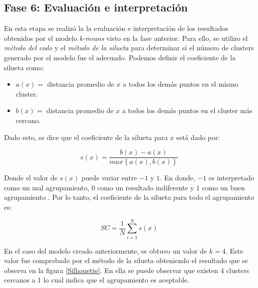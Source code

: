 \subsection*{Fase 6: Evaluación e interpretación}

En esta etapa se realizó la la evaluación e interpretación de los resultados obtenidos por el modelo \textit{k-means} visto en la fase anterior. Para ello, se utilizo el \textit{método del codo} y el \textit{método de la silueta} para determinar si el número de clusters generado por el modelo fue el adecuado. Podemos definir el coeficiente de la silueta como:

\begin{itemize}[label=]
	\item $a(x)=$ distancia promedio de $x$ a todos los demás puntos en el mismo cluster.\\
	\item $b(x)=$ distancia promedio de $x$ a todos los demás puntos en el cluster más cercano.
\end{itemize}

Dado esto, se dice que el coeficiente de la silueta para $x$ está dado por:

\begin{equation}
	s(x) = \frac{b(x)-a(x)}{max\left\lbrace a(x), b(x) \right\rbrace }
\end{equation}

\break
Donde el valor de $s(x)$ puede variar entre $-1$ y $1$. En donde, $-1$ es interpretado como un mal agrupamiento, $0$ como un resultado indiferente y $1$ como un buen agrupamiento \cite{Ramirez2018}. Por lo tanto, el coeficiente de la silueta para todo el agrupamiento es:

\begin{equation}
	SC = \frac{1}{N} \sum_{i = 1}^{N}s(x)
\end{equation}

En el caso del modelo  creado anteriormente, se obtuvo un valor de $k = 4$. Este valor fue comprobado por el método de la silueta obteniendo el resultado que se observa en la figura \ref{Silhouette}. En ella se puede observar que existen $4$ clusters cercanos a $1$ lo cual indica que el agrupamiento es aceptable. 

